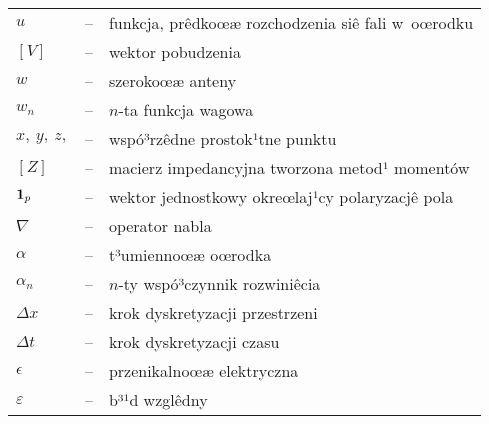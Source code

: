 {\begin{tabular}{lcp{9cm}}
  $u$ & -- & funkcja, prêdkoœæ rozchodzenia siê fali w~oœrodku\\
  $[V]$ & -- & wektor pobudzenia \\
  $w$ & -- & szerokoœæ anteny\\
  $w_n$ & -- & $n$-ta funkcja wagowa\\
  $x,~y,~z,$ & -- & wspó³rzêdne prostok¹tne punktu \\
  $[Z]$ & -- & macierz impedancyjna tworzona metod¹ momentów \\
  ${\bf 1}_{p}$ & -- & wektor jednostkowy okreœlaj¹cy polaryzacjê pola \\%
  $\nabla$ & -- & operator nabla\\
  $\alpha$ & -- & t³umiennoœæ oœrodka\\
  $\alpha_n$ & -- & $n$-ty wspó³czynnik rozwiniêcia\\
  $\Delta x$ & -- & krok dyskretyzacji przestrzeni\\
  $\Delta t$ & -- & krok dyskretyzacji czasu\\
  $\epsilon$ & -- & przenikalnoœæ elektryczna \\
  $\varepsilon$ & -- & b³¹d wzglêdny
 \end{tabular}
}
\newpage
\thispagestyle{empty}%
\cleardoublepage%
